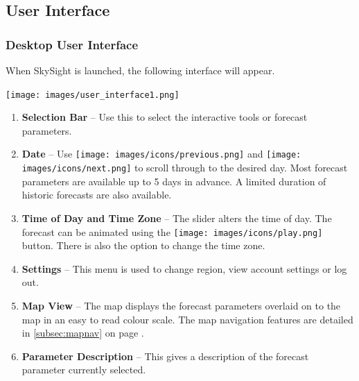 \documentclass[11pt,a4paper]{article}
\begin{document}
\subsection{User Interface}
\subsubsection{Desktop User Interface}
When SkySight is launched, the following interface will appear.
\begin{center}
\texttt{[image: images/user\_interface1.png]}
\end{center}
\begin{enumerate}
\item \textbf{Selection Bar} -- Use this to select the interactive tools or forecast parameters.
\item \textbf{Date}  -- Use \texttt{[image: images/icons/previous.png]} and \texttt{[image: images/icons/next.png]}  to scroll through to the desired day. Most forecast parameters are available up to 5 days in advance. A limited duration of historic forecasts are also available.
\item \textbf{Time of Day and Time Zone} -- The slider alters the time of day. The forecast can be animated using the \texttt{[image: images/icons/play.png]} button. There is also the option to change the time zone.
\item \textbf{Settings} -- This menu is used to change region, view account settings or log out.
\item \textbf{Map View} -- The map displays the forecast parameters overlaid on to the map in an easy to read colour scale. The map navigation features are detailed in \ref{subsec:mapnav} on page \pageref{subsec:mapnav}.
\item \textbf{Parameter Description} -- This gives a description of the forecast parameter currently selected.
\end{enumerate}
\end{document}
